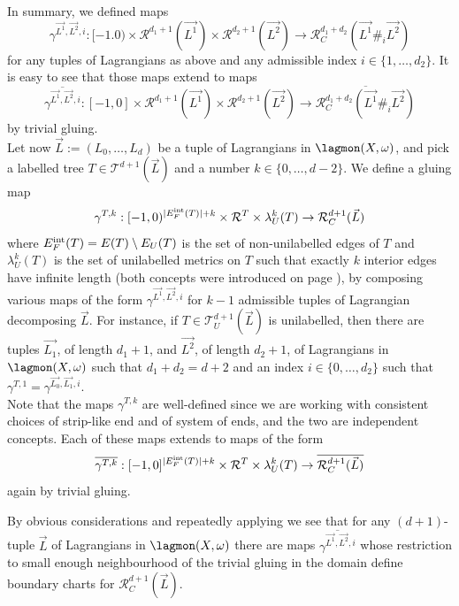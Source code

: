 \noindent In summary, we defined maps $$\gamma^{\vec{L^1},\vec{L^2},i}: [-1.0)\times \mathcal{R}^{d_1+1}(\vec{L^1}) \times \mathcal{R}^{d_2+1}(\vec{L^2})\to \mathcal{R}^{d_1+d_2}_C(\vec{L^1}\#_i\vec{L^2})$$ for any tuples of Lagrangians as above and any admissible index $i\in \{1,\ldots, d_2\}$. It is easy to see that those maps extend to maps $$\overline{\gamma^{\vec{L^1},\vec{L^2},i}}: [-1,0]\times   \mathcal{R}^{d_1+1}(\vec{L^1}) \times \mathcal{R}^{d_2+1}(\vec{L^2})\to \overline{\mathcal{R}^{d_1+d_2}_C(\vec{L^1}\#_i\vec{L^2})}$$ by trivial gluing.\\

Let now $\vec{L}:=(L_0,\ldots,L_d)$ be a tuple of Lagrangians in $\lagmon(X,\omega)$, and pick a labelled tree $T\in \mathcal{T}^{d+1}(\vec{L})$ and a number $k\in \{0,\ldots,d-2\}$. We define a gluing map $$\gamma^{T,k}: [-1,0)^{|E^\textnormal{int}_F(T)|+k}\times \mathcal{R}^T\times \lambda^k_U(T)\to \mathcal{R}^{d+1}_C(\vec{L})$$ where $E^\textnormal{int}_F(T)= E(T)\setminus E_U(T)$ is the set of non-unilabelled edges of $T$ and $\lambda^k_U(T)$ is the set of unilabelled metrics on $T$ such that exactly $k$ interior edges have infinite length (both concepts were introduced on page \pageref{sectionlagtrees}), by composing various maps of the form $\gamma^{\vec{L^1},\vec{L^2},i}$ for $k-1$ admissible tuples of Lagrangian decomposing $\vec{L}$. For instance, if $T\in \mathcal{T}^{d+1}_U(\vec{L})$ is unilabelled, then there are tuples $\vec{L_1}$, of length $d_1+1$, and $\vec{L^2}$, of length $d_2+1$, of Lagrangians in $\lagmon(X,\omega)$ such that $d_1+d_2=d+2$ and an index $i\in \{0,\ldots, d_2\}$ such that $\gamma^{T,1}= \gamma^{\vec{L_0},\vec{L_1},i}$.\\
Note that the maps $\gamma^{T,k}$ are well-defined since we are working with consistent choices of strip-like end and of system of ends, and the two are independent concepts. Each of these maps extends to maps of the form $$\overline{\gamma^{T,k}}:[-1,0]^{|E^\textnormal{int}_F(T)|+k}\times \mathcal{R}^T\times \lambda^k_U(T)\to \overline{\mathcal{R}^{d+1}_C(\vec{L})}$$ again by trivial gluing.

By obvious considerations and repeatedly applying \cite[Lemma 9.2]{Se:book-fukaya-categ} we see that for any $(d+1)$-tuple $\vec{L}$ of Lagrangians in $\lagmon(X,\omega)$ there are maps $\overline{\gamma^{\vec{L^1},\vec{L^2},i}}$ whose restriction to small enough neighbourhood of the trivial gluing in the domain define boundary charts for $\mathcal{R}^{d+1}_C(\vec{L})$.

